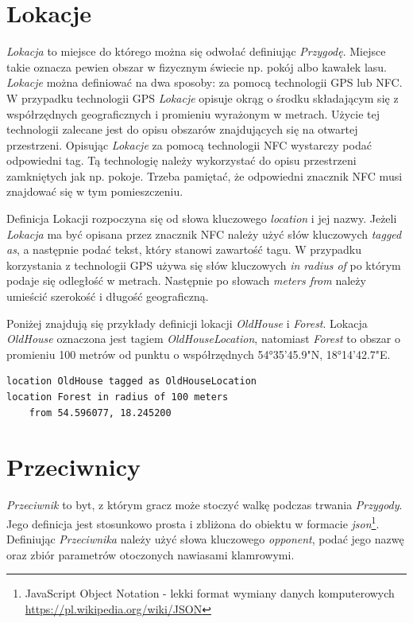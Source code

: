 \documentclass[openright]{xmgr}
\begin{document}
\section{Lokacje}
\textit{Lokacja} to miejsce do którego można się odwołać definiując \textit{Przygodę}. Miejsce takie oznacza pewien obszar w fizycznym świecie np. pokój albo kawałek lasu. \textit{Lokacje} można definiować na dwa sposoby: za pomocą technologii GPS lub NFC. 
W przypadku technologii GPS \textit{Lokacje} opisuje okrąg o środku składającym się z współrzędnych geograficznych i promieniu wyrażonym w metrach. Użycie tej technologii zalecane jest do opisu obszarów znajdujących się na otwartej przestrzeni.
Opisując \textit{Lokacje} za pomocą technologii NFC wystarczy podać odpowiedni tag. Tą technologię należy wykorzystać do opisu przestrzeni zamkniętych jak np. pokoje. Trzeba pamiętać, że odpowiedni znacznik NFC musi znajdować się w tym pomieszczeniu.

Definicja Lokacji rozpoczyna się od słowa kluczowego \textit{location} i jej nazwy. Jeżeli \textit{Lokacja} ma być opisana przez znacznik NFC należy użyć słów kluczowych \textit{tagged as}, a następnie podać tekst, który stanowi zawartość tagu. W przypadku korzystania z technologii GPS używa się słów kluczowych \textit{in radius of} po którym podaje się odległość w metrach. Następnie po słowach \textit{meters from} należy umieścić szerokość i długość geograficzną.

Poniżej znajdują się przykłady definicji lokacji \textit{OldHouse} i \textit{Forest}. Lokacja \textit{OldHouse} oznaczona jest tagiem \textit{OldHouseLocation}, natomiast \textit{Forest} to obszar o promieniu 100 metrów od punktu o współrzędnych 54°35'45.9"N, 18°14'42.7"E.
\begin{verbatim}
location OldHouse tagged as OldHouseLocation
location Forest in radius of 100 meters 
	from 54.596077, 18.245200
\end{verbatim}

\section{Przeciwnicy}

\textit{Przeciwnik} to byt, z którym gracz może stoczyć walkę podczas trwania \textit{Przygody}. Jego definicja jest stosunkowo prosta i zbliżona do obiektu w formacie \textit{json}\footnote{JavaScript Object Notation - lekki format wymiany danych komputerowych \url{https://pl.wikipedia.org/wiki/JSON}}. Definiując \textit{Przeciwnika} należy użyć słowa kluczowego \textit{opponent}, podać jego nazwę oraz zbiór parametrów otoczonych nawiasami klamrowymi.
\end{document}
